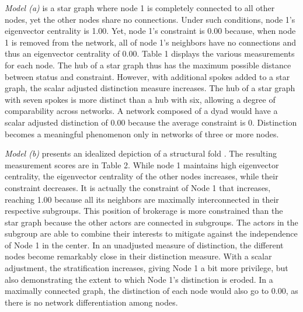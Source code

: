 \documentclass[12pt]{article}
\begin{document}
\textit{Model (a)} is a star graph where node 1 is completely connected to all other nodes, yet the other nodes share no connections. Under such conditions, node 1's eigenvector centrality is 1.00. Yet, node 1's constraint is 0.00 because, when node 1 is removed from the network, all of node 1's neighbors have no connections and thus an eigenvector centrality of 0.00. Table 1 displays the various measurements for each node. The hub of a star graph thus has the maximum possible distance between status and constraint. However, with additional spokes added to a star graph, the scalar adjusted distinction measure increases. The hub of a star graph with seven spokes is more distinct than a hub with six, allowing a degree of comparability across networks. A network composed of a dyad would have a scalar adjusted distinction of 0.00 because the average constraint is 0. Distinction becomes a meaningful phenomenon only in networks of three or more nodes. 

\textit{Model (b)} presents an idealized depiction of a structural fold \citep{vedres2010structural}. The resulting measurement scores are in Table 2. While node 1 maintains high eigenvector centrality, the eigenvector centrality of the other nodes increases, while their constraint decreases. It is actually the constraint of Node 1 that increases, reaching 1.00 because all its neighbors are maximally interconnected in their respective subgroups. This position of brokerage is more constrained than the star graph because the other actors are connected in subgroups. The actors in the subgroup are able to combine their interests to mitigate against the independence of Node 1 in the center. In an unadjusted measure of distinction, the different nodes become remarkably close in their distinction measure. With a scalar adjustment, the stratification increases, giving Node 1 a bit more privilege, but also demonstrating the extent to which Node 1's distinction is eroded. In a maximally connected graph, the distinction of each node would also go to 0.00, as there is no network differentiation among nodes. 
\end{document}
